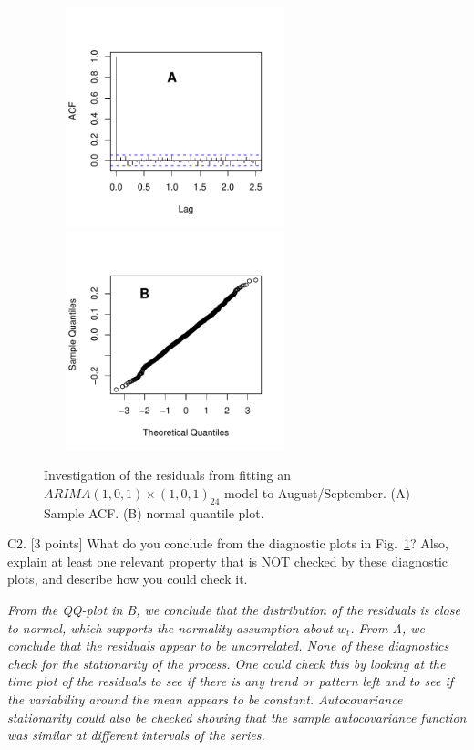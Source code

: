 \documentclass[11pt]{article}
\begin{document}
\begin{figure}[ht]
\vspace{-1cm}
\includegraphics[width=3in,height=2.5in]{ER-resid-acf}
\includegraphics[width=3in,height=2.5in]{ER-qqnorm}
\vspace{-0.5cm}
\caption{ Investigation of the residuals from fitting an $ARIMA(1,0,1){\times}(1,0,1)_{24}$ model to August/September. (A) Sample ACF. (B) normal quantile plot.}\label{fig:diag}
\end{figure}
C2. [3 points] What do you conclude from the diagnostic plots in
Fig.~\ref{fig:diag}? Also, explain at least one relevant property
that is NOT checked by these diagnostic plots, and describe how you
could check it.

{\it
From the QQ-plot in B, we conclude that the distribution of the
residuals is close to normal, which supports the normality
assumption about $w_t$. From A, we conclude that the residuals
appear to be uncorrelated. None of these diagnostics check for the
stationarity of the process. One could check this by looking at the
time plot of the residuals to see if there is any trend or pattern left and
to see if the variability around the mean appears to be constant.
Autocovariance stationarity could also be checked showing that the
sample autocovariance function was similar at different intervals of
the series.
}
\end{document}
